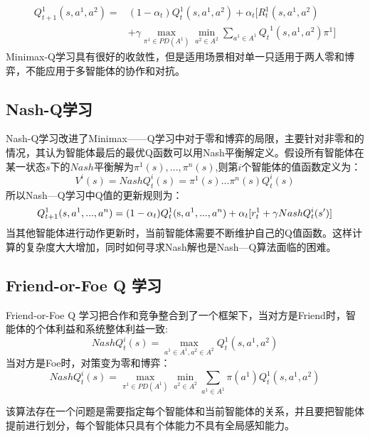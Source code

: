 \begin{equation}
\begin{aligned}
Q_{t + 1}^1(s,{a^1},{a^2}) =& (1 - {\alpha _t})Q_t^1(s,{a^1},{a^2}) + {\alpha _t}[R_t^1(s,{a^1},{a^2}) \\& + \gamma\mathop {\max }\limits_{{\pi ^1} \in PD({A^1})} \mathop {\min }\limits_{{a^2} \in {A^2}} \sum\limits_{{a^1} \in {A^1}} {{Q_t}^1(s,{a^1},{a^2})} {\pi ^1} ]
\end{aligned}
\end{equation}
Minimax-Q学习具有很好的收敛性，但是适用场景相对单一只适用于两人零和博弈，不能应用于多智能体的协作和对抗。
\subsection{Nash-Q学习}
Nash-Q学习改进了Minimax——Q学习中对于零和博弈的局限，主要针对非零和的情况，其认为智能体最后的最优Q函数可以用Nash平衡解定义。假设所有智能体在某一状态$s$下的$Nash$平衡解为${\pi ^1}(s),...,{\pi ^n}(s)$,则第$i$个智能体的值函数定义为：
\begin{equation}
	{V^i}(s) = NashQ_t^i(s) = {\pi ^1}(s)...{\pi ^n}(s)Q_t^i(s)
\end{equation}
所以Nash—Q学习中Q值的更新规则为：
\begin{equation}
Q_{t + 1}^1(s,{a^1},...,{a^n}) = (1 - {\alpha _t})Q_t^1({\rm{s}},{a^1},...,{a^n}) + {\alpha _t}[r_t^1 + \gamma NashQ_t^i(s')]
\end{equation}
当其他智能体进行动作更新时，当前智能体需要不断维护自己的Q值函数。这样计算的复杂度大大增加，同时如何寻求Nash解也是Nash—Q算法面临的困难。
\subsection{Friend-or-Foe Q 学习}
Friend-or-Foe Q 学习把合作和竞争整合到了一个框架下，当对方是Friend时，智能体的个体利益和系统整体利益一致:
\begin{equation}
NashQ_t^i(s) = \mathop {\max }\limits_{{a^1} \in {A^1},{a^2} \in {A^2}} Q_t^1(s,{a^1},{a^2})
\end{equation}
当对方是Foe时，对策变为零和博弈：
\begin{equation}
	NashQ_t^i(s) = \mathop {\max }\limits_{{\pi ^1} \in PD({A^1})} \mathop {\min }\limits_{{a^2} \in {A^2}} \sum\limits_{{a^1} \in {A^1}} {\pi ({a^1})} Q_t^1(s,{a^1},{a^2})
\end{equation}

该算法存在一个问题是需要指定每个智能体和当前智能体的关系，并且要把智能体提前进行划分，每个智能体只具有个体能力不具有全局感知能力。

